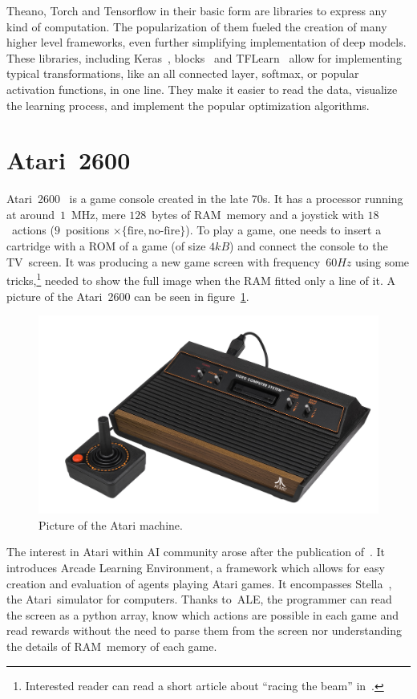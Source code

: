 \renewcommand{\figurename}{Figure}
Theano, Torch and Tensorflow in their basic form are libraries to express any kind of computation. The popularization of them fueled the creation of many higher level frameworks, even further simplifying implementation of deep models. These libraries, including Keras~\cite{keras}, blocks~\cite{blocks} and TFLearn~\cite{tflearn} allow for implementing typical transformations, like an all connected layer, softmax, or popular activation functions, in one line. They make it easier to read the data, visualize the learning process, and implement the popular optimization algorithms.

\section{Atari~2600}
Atari~2600~\cite{atari} is a game console created in the late 70s. It has a processor running at around~$1$~MHz, mere $128$~bytes of RAM~memory and a joystick with $18$~actions ($9$~positions $\times \{\mbox{fire}, \mbox{no-fire}\}$). To play a game, one needs to insert a cartridge with a ROM of a game (of size $4kB$) and connect the console to the TV~screen. It was producing a new game screen with frequency~$60Hz$ using some tricks,\footnote{Interested reader can read a short article about ``racing the beam'' in~\cite{racing-beam}.} needed to show the full image when the RAM fitted only a line of it. A picture of the Atari~2600 can be seen in figure~\ref{atari-picture}.

\begin{figure}
  \centering
  \includegraphics[width=.8\linewidth]{images/atari.jpg}
  \caption{Picture of the Atari machine.}\label{atari-picture}
\end{figure}

The interest in Atari within AI community arose after the publication of~\cite{ale}. It introduces Arcade Learning Environment, a framework which allows for easy creation and evaluation of agents playing Atari games. It encompasses Stella~\cite{stella}, the Atari~simulator for computers. Thanks to~ALE, the programmer can read the screen as a python array, know which actions are possible in each game and read rewards without the need to parse them from the screen nor understanding the details of RAM~memory of each game.

